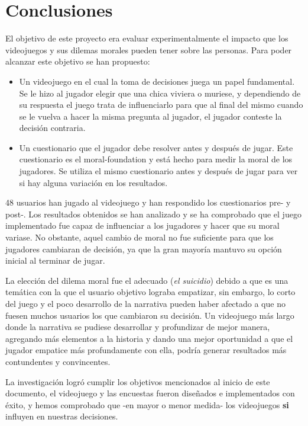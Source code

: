 \section{Conclusiones}


El objetivo de este proyecto era evaluar experimentalmente el impacto que los videojuegos y sus dilemas morales pueden tener sobre las personas. Para poder alcanzar este objetivo se han propuesto:

\begin{itemize}
    \item Un videojuego en el cual la toma de decisiones juega un papel fundamental. Se le hizo al jugador elegir que una chica viviera o muriese, y dependiendo de su respuesta el juego trata de influenciarlo para que al final del mismo cuando se le vuelva a hacer la misma pregunta al jugador, el jugador conteste la decisión contraria.
    \item Un cuestionario que el jugador debe resolver antes y después de jugar. Este cuestionario es el \gls{moral-foundation} y está hecho para medir la moral de los jugadores. Se utiliza el mismo cuestionario antes y después de jugar para ver si hay alguna variación en los resultados.
\end{itemize}
   
48 usuarios han jugado al videojuego y han respondido los cuestionarios pre- y post-. Los resultados obtenidos se han analizado y se ha comprobado que el juego implementado fue capaz de influenciar a los jugadores y hacer que su moral variase. No obstante, aquel cambio de moral no fue suficiente para que los jugadores cambiaran de decisión, ya que la gran mayoría mantuvo su opción inicial al terminar de jugar.

La elección del dilema moral fue el adecuado (\textit{el suicidio}) debido a que es una temática con la que el usuario objetivo lograba empatizar, sin embargo, lo corto del juego y el poco desarrollo de la narrativa pueden haber afectado a que no fuesen muchos usuarios los que cambiaron su decisión. Un videojuego más largo donde la narrativa se pudiese desarrollar y profundizar de mejor manera, agregando más elementos a la historia y dando una mejor oportunidad a que el jugador empatice más profundamente con ella, podría generar resultados más contundentes y convincentes.

La investigación logró cumplir los objetivos mencionados al inicio de este documento, el videojuego y las encuestas fueron diseñados e implementados con éxito, y hemos comprobado que -en mayor o menor medida- los videojuegos \textbf{si} influyen en nuestras decisiones.